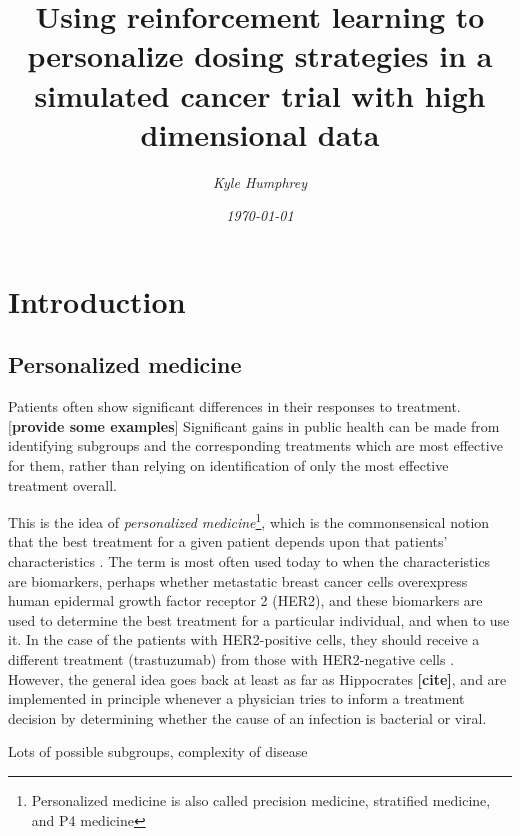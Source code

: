 \documentclass[12pt]{article}
\title{\normalfont \Large Using reinforcement learning to personalize dosing strategies in a simulated cancer trial with high dimensional data}
\author{\normalsize \sl Kyle Humphrey}
\date{\normalsize \sl \today}
\begin{document}
\maketitle

\section{Introduction}

\subsection{Personalized medicine} %
\label{sub:personalized_medicine}


Patients often show significant differences in their responses to treatment. [\textbf{provide some examples}] Significant gains in public health can be made from identifying subgroups and the corresponding treatments which are most effective for them, rather than relying on identification of only the most effective treatment overall.


This is the idea of \emph{personalized medicine}\footnote{Personalized medicine is also called precision medicine, stratified medicine, and P4 medicine}, which is the commonsensical notion that the best treatment for a given patient depends upon that patients' characteristics \cite{defn-paper}. The term is most often used today to when the characteristics are biomarkers, perhaps whether metastatic breast cancer cells  overexpress human epidermal growth factor receptor 2 (HER2), and these biomarkers are used to determine the best treatment for a particular individual, and when to use it. In the case of the patients with HER2-positive cells, they should receive a different treatment (trastuzumab) from those with HER2-negative cells \cite{} .
However, the general idea goes back at least as far as Hippocrates \textbf{[cite]}, and are implemented in principle whenever a physician tries to inform a treatment decision by determining whether the cause of an infection is bacterial or viral.




Lots of possible subgroups, complexity of disease
\end{document}

